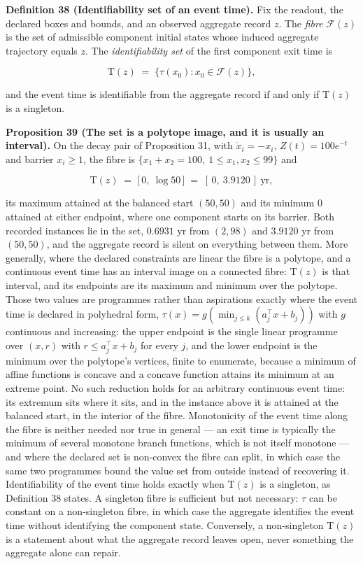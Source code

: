 \documentclass[11pt]{article}
\begin{document}
\textbf{Definition 38 (Identifiability set of an event time).} Fix the readout, the declared boxes and bounds, and an observed aggregate record \(z\). The \emph{fibre} \(\mathcal F(z)\) is the set of admissible component initial states whose induced aggregate trajectory equals \(z\). The \emph{identifiability set} of the first component exit time is 

$$\mathrm T(z) \;=\; \bigl\{\tau(x_0) : x_0 \in \mathcal F(z)\bigr\},$$

 and the event time is identifiable from the aggregate record if and only if \(\mathrm T(z)\) is a singleton.

\textbf{Proposition 39 (The set is a polytope image, and it is usually an interval).} On the decay pair of Proposition 31, with \(\dot x_i = -x_i\), \(Z(t) = 100 e^{-t}\) and barrier \(x_i \ge 1\), the fibre is \(\{x_1 +\allowbreak{} x_2 =\allowbreak{} 100,\allowbreak{}\ 1 \le x_1,\allowbreak{} x_2 \le 99\}\) and 

$$\mathrm T(z) \;=\; \bigl[\,0,\ \log 50\,\bigr] \;=\; [\,0,\ 3.9120\,] \ \text{yr},$$

 its maximum attained at the balanced start \((50, 50)\) and its minimum \(0\) attained at either endpoint, where one component starts on its barrier. Both recorded instances lie in the set, \(0.6931\) yr from \((2, 98)\) and \(3.9120\) yr from \((50, 50)\), and the aggregate record is silent on everything between them. More generally, where the declared constraints are linear the fibre is a polytope, and a continuous event time has an interval image on a connected fibre: \(\mathrm T(z)\) is that interval, and its endpoints are its maximum and minimum over the polytope. Those two values are programmes rather than aspirations exactly where the event time is declared in polyhedral form, \(\tau(x) =\allowbreak{} g(\min_{j \le k}(a_j^{\top} x +\allowbreak{} b_j))\) with \(g\) continuous and increasing: the upper endpoint is the single linear programme over \((x, r)\) with \(r \le a_j^{\top} x + b_j\) for every \(j\), and the lower endpoint is the minimum over the polytope's vertices, finite to enumerate, because a minimum of affine functions is concave and a concave function attains its minimum at an extreme point. No such reduction holds for an arbitrary continuous event time: its extremum sits where it sits, and in the instance above it is attained at the balanced start, in the interior of the fibre. Monotonicity of the event time along the fibre is neither needed nor true in general --- an exit time is typically the minimum of several monotone branch functions, which is not itself monotone --- and where the declared set is non-convex the fibre can split, in which case the same two programmes bound the value set from outside instead of recovering it. Identifiability of the event time holds exactly when \(\mathrm T(z)\) is a singleton, as Definition 38 states. A singleton fibre is sufficient but not necessary: \(\tau\) can be constant on a non-singleton fibre, in which case the aggregate identifies the event time without identifying the component state. Conversely, a non-singleton \(\mathrm T(z)\) is a statement about what the aggregate record leaves open, never something the aggregate alone can repair.
\end{document}
